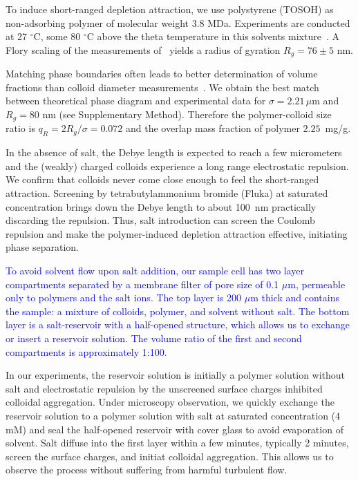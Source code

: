 \documentclass[preprint,amsmath,amssymb,superscriptaddress]{revtex4-1}
\begin{document}
To induce short-ranged depletion attraction, we use polystyrene (TOSOH) as non-adsorbing polymer of molecular weight 3.8 MDa.
Experiments are conducted at 27 $^\circ$C, some 80 $^\circ$C above the theta temperature in this solvents mixture~\cite{Royall2007}. A Flory scaling of the measurements of~\cite{lu2008gelation} yields a radius of gyration $R_g=76\pm5$ nm.

Matching phase boundaries often leads to better determination of volume fractions than colloid diameter measurements~\cite{Poon2012}. We obtain the best match between theoretical phase diagram and experimental data for $\sigma=2.21\,\mu$m and $R_g=80$ nm (see Supplementary Method). Therefore the polymer-colloid size ratio is $q_R=2R_g/\sigma=0.072$ and the overlap mass fraction of polymer $2.25$~mg/g.

In the absence of salt, the Debye length is expected to reach a few micrometers and the (weakly) charged colloids experience a long range electrostatic repulsion. We confirm that colloids never come close enough to feel the short-ranged attraction. Screening by tetrabutylammonium bromide (Fluka) at saturated concentration brings down the Debye length to about 100~nm practically discarding the repulsion. 
Thus, salt introduction can screen the Coulomb repulsion and make the polymer-induced depletion attraction effective, initiating phase separation. 

\textcolor{blue}{To avoid solvent flow upon salt addition, our sample cell has two layer compartments separated by a membrane filter of pore size of 0.1 $\mu$m, permeable only to polymers and the salt ions. The top layer is 200 $\mu$m thick and contains the sample: a mixture of colloids, polymer, and solvent without salt. The bottom layer is a salt-reservoir with a half-opened structure, which allows us to exchange or insert a reservoir solution. The volume ratio of the first and second compartments is approximately 1:100.}

In our experiments, the reservoir solution is initially a polymer solution without salt and electrostatic repulsion by the unscreened surface charges inhibited colloidal aggregation. Under microscopy observation, we quickly exchange the reservoir solution to a polymer solution with salt at saturated concentration (4 mM) and seal the half-opened reservoir with cover glass to avoid evaporation of solvent. Salt diffuse into the first layer within a few minutes, typically 2 minutes, screen the surface charges, and initiat colloidal aggregation. This allows us to observe the process without suffering from harmful turbulent flow.
\end{document}

